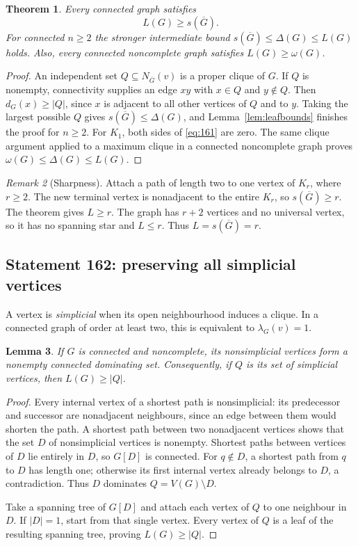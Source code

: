\documentclass[11pt,a4paper]{article}
\newtheorem{theorem}{Theorem}[section]
\newtheorem{lemma}[theorem]{Lemma}
\theoremstyle{remark}
\newtheorem{remark}[theorem]{Remark}
\begin{document}
\begin{theorem}\label{thm:161}
Every connected graph satisfies
\begin{equation}\label{eq:161}
L(G)\ge s(\overline G).
\end{equation}
For connected $n\ge2$ the stronger intermediate bound
$s(\overline G)\le\Delta(G)\le L(G)$ holds. Also, every connected
noncomplete graph satisfies $L(G)\ge\omega(G)$.
\end{theorem}
\begin{proof}
An independent set $Q\subseteq N_{\overline G}(v)$ is a proper clique
of $G$. If $Q$ is nonempty, connectivity supplies an edge $xy$ with
$x\in Q$ and $y\notin Q$. Then $d_G(x)\ge|Q|$, since $x$ is adjacent
to all other vertices of $Q$ and to $y$. Taking the largest possible $Q$
gives $s(\overline G)\le\Delta(G)$, and Lemma~\ref{lem:leafbounds}
finishes the proof for $n\ge2$. For $K_1$, both sides of \eqref{eq:161}
are zero. The same clique argument applied to a maximum clique in a
connected noncomplete graph proves $\omega(G)\le\Delta(G)\le L(G)$.
\end{proof}

\begin{remark}[Sharpness]
Attach a path of length two to one vertex of $K_r$, where $r\ge2$.
The new terminal vertex is nonadjacent to the entire $K_r$, so
$s(\overline G)\ge r$. The theorem gives $L\ge r$.
The graph has $r+2$ vertices and no universal vertex, so it has no spanning
star and $L\le r$. Thus $L=s(\overline G)=r$.
\end{remark}

\subsection{Statement 162: preserving all simplicial vertices}

A vertex is \emph{simplicial} when its open neighbourhood induces a clique.
In a connected graph of order at least two, this is equivalent to
$\lambda_G(v)=1$.

\begin{lemma}\label{lem:simplicial}
If $G$ is connected and noncomplete, its nonsimplicial vertices form a
nonempty connected dominating set. Consequently, if $Q$ is its set of
simplicial vertices, then $L(G)\ge |Q|$.
\end{lemma}
\begin{proof}
Every internal vertex of a shortest path is nonsimplicial: its predecessor
and successor are nonadjacent neighbours, since an edge between them would
shorten the path. A shortest path between two nonadjacent vertices shows
that the set $D$ of nonsimplicial vertices is nonempty. Shortest paths
between vertices of $D$ lie entirely in $D$, so $G[D]$ is connected.
For $q\notin D$, a shortest path from $q$ to $D$ has length one; otherwise
its first internal vertex already belongs to $D$, a contradiction.
Thus $D$ dominates $Q=V(G)\setminus D$.

Take a spanning tree of $G[D]$ and attach each vertex of $Q$ to one
neighbour in $D$. If $|D|=1$, start from that single vertex. Every vertex
of $Q$ is a leaf of the resulting spanning tree, proving $L(G)\ge|Q|$.
\end{proof}
\end{document}
